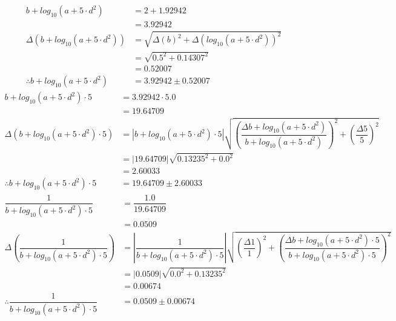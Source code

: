 \documentclass[a4paper]{article}
\begin{document}
\begin{align*}
b + log_{ 10 }\left( a + 5 \cdot d ^ { 2 } \right) &= 2 + 1.92942 \\
&= 3.92942 \\[4mm]
\Delta \left( b + log_{ 10 }\left( a + 5 \cdot d ^ { 2 } \right) \right) &= \sqrt{ \Delta \left( b \right) ^ { 2 } + \Delta \left( log_{ 10 }\left( a + 5 \cdot d ^ { 2 } \right) \right) ^ { 2 }} \\
&= \sqrt{ 0.5 ^ { 2 } + 0.14307 ^ { 2 }} \\
&= 0.52007\\[4mm]
\therefore b + log_{ 10 }\left( a + 5 \cdot d ^ { 2 } \right) &= 3.92942 \pm 0.52007
\end{align*}
\begin{align*}
b + log_{ 10 }\left( a + 5 \cdot d ^ { 2 } \right) \cdot 5 &= 3.92942 \cdot 5.0 \\
&= 19.64709 \\[4mm]
\Delta \left( b + log_{ 10 }\left( a + 5 \cdot d ^ { 2 } \right) \cdot 5 \right) &= \left| b + log_{ 10 }\left( a + 5 \cdot d ^ { 2 } \right) \cdot 5 \right|\sqrt{ \left( \dfrac{ \Delta b + log_{ 10 }\left( a + 5 \cdot d ^ { 2 } \right) }{ b + log_{ 10 }\left( a + 5 \cdot d ^ { 2 } \right) } \right) ^ { 2 } + \left( \dfrac{ \Delta 5 }{ 5 } \right) ^ { 2 }} \\
&= \left| 19.64709 \right|\sqrt{ 0.13235 ^ { 2 } + 0.0 ^ { 2 }} \\
&= 2.60033\\[4mm]
\therefore b + log_{ 10 }\left( a + 5 \cdot d ^ { 2 } \right) \cdot 5 &= 19.64709 \pm 2.60033
\end{align*}
\begin{align*}
\dfrac{ 1 }{ b + log_{ 10 }\left( a + 5 \cdot d ^ { 2 } \right) \cdot 5 } &= \dfrac{ 1.0 }{ 19.64709 } \\
&= 0.0509 \\[4mm]
\Delta \left( \dfrac{ 1 }{ b + log_{ 10 }\left( a + 5 \cdot d ^ { 2 } \right) \cdot 5 } \right) &= \left| \dfrac{ 1 }{ b + log_{ 10 }\left( a + 5 \cdot d ^ { 2 } \right) \cdot 5 } \right|\sqrt{ \left( \dfrac{ \Delta 1 }{ 1 } \right) ^ { 2 } + \left( \dfrac{ \Delta b + log_{ 10 }\left( a + 5 \cdot d ^ { 2 } \right) \cdot 5 }{ b + log_{ 10 }\left( a + 5 \cdot d ^ { 2 } \right) \cdot 5 } \right) ^ { 2 }} \\
&= \left| 0.0509 \right|\sqrt{ 0.0 ^ { 2 } + 0.13235 ^ { 2 }} \\
&= 0.00674\\[4mm]
\therefore \dfrac{ 1 }{ b + log_{ 10 }\left( a + 5 \cdot d ^ { 2 } \right) \cdot 5 } &= 0.0509 \pm 0.00674
\end{align*}
\end{document}
